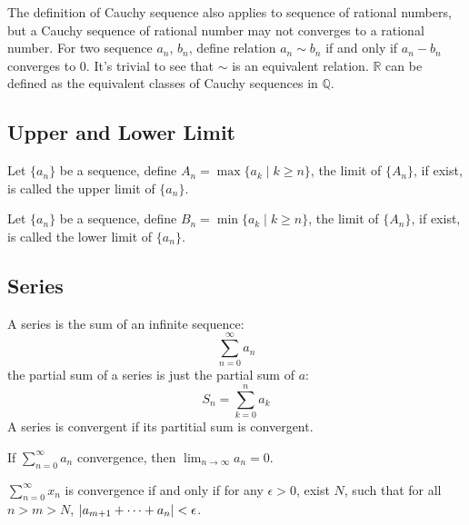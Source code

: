 The definition of Cauchy sequence also applies to sequence of rational numbers,
but a Cauchy sequence of rational number may not converges to a rational number.
For two sequence $a_n$, $b_n$, define relation $a_n \sim b_n$ if and only if
$a_n - b_n$ converges to $0$.
It's trivial to see that $\sim$ is an equivalent relation.
$\mathbb R$ can be defined as the equivalent classes of Cauchy sequences in $\mathbb Q$.

\subsection{Upper and Lower Limit}

\begin{defi}
Let $\{a_n\}$ be a sequence, define $A_n = \max\{a_k \mid k \geq n\}$,
the limit of $\{A_n\}$, if exist, is called the upper limit of $\{a_n\}$.
\end{defi}

\begin{defi}
Let $\{a_n\}$ be a sequence, define $B_n = \min\{a_k \mid k \geq n\}$,
the limit of $\{A_n\}$, if exist, is called the lower limit of $\{a_n\}$.
\end{defi}


\subsection{Series}
A series is the sum of an infinite sequence: $$\sum_{n=0}^\infty a_n$$
the partial sum of a series is just the partial sum of $a$:
$$S_n = \sum_{k=0}^n a_k$$
A series is convergent if its partitial sum is convergent.
\begin{pro}
If $\sum_{n=0}^\infty a_n$ convergence, then $\lim_{n \to \infty} a_n = 0$.
\end{pro}

\begin{pro}
$\sum_{n=0}^\infty x_n$ is convergence if and only if for any $\epsilon > 0$,
exist $N$, such that for all $n > m > N$, $\left| {a_{m+1} + \cdots + a_n} \right| < \epsilon$.
\end{pro}
